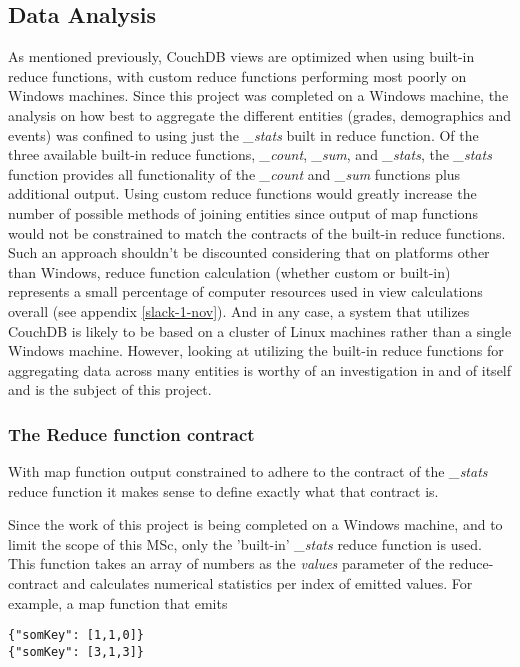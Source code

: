 \subsection{Data Analysis}
As mentioned previously, CouchDB views are optimized when using built-in reduce functions, with custom reduce functions performing most poorly on Windows machines. Since this project was completed on a Windows machine, the analysis on how best to aggregate the different entities (grades, demographics and events) was confined to using just the \textit{\_stats} built in reduce function. Of the three available built-in reduce functions, \textit{\_count}, \textit{\_sum}, and \textit{\_stats}, the \textit{\_stats} function provides all functionality of the \textit{\_count} and \textit{\_sum} functions plus additional output. Using custom reduce functions would greatly increase the number of possible methods of joining entities since output of map functions would not be constrained to match the contracts of the built-in reduce functions. Such an approach shouldn't be discounted considering that on platforms other than Windows, reduce function calculation (whether custom or built-in) represents a small percentage of computer resources used in view calculations overall (see appendix \ref{slack-1-nov}). And in any case, a system that utilizes CouchDB is likely to be based on a cluster of Linux machines rather than a single Windows machine. However, looking at utilizing the built-in reduce functions for aggregating data across many entities is worthy of an investigation in and of itself and is the subject of this project.

\subsubsection{The Reduce function contract}
With map function output constrained to adhere to the contract of the \textit{\_stats} reduce function it makes sense to define exactly what that contract is.

Since the work of this project is being completed on a Windows machine, and to limit the scope of this MSc, only the 'built-in' \textit{\_stats} reduce function is used. This function takes an array of numbers as the \textit{values} parameter of the reduce-contract and calculates numerical statistics per index of emitted values. For example, a map function that emits

\begin{verbatim}
{"somKey": [1,1,0]}
{"somKey": [3,1,3]}
\end{verbatim}

